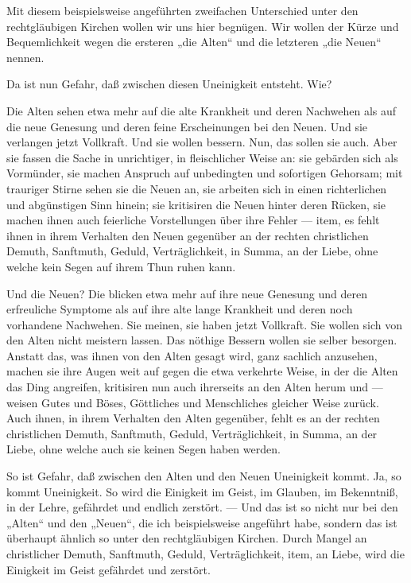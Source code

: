 Mit diesem beispielsweise angeführten zweifachen Unterschied unter den rechtgläubigen Kirchen wollen wir uns hier begnügen. Wir wollen der Kürze und Bequemlichkeit wegen die ersteren „die Alten“ und die letzteren „die Neuen“ nennen.

Da ist nun Gefahr, daß zwischen diesen Uneinigkeit entsteht. Wie?

Die Alten sehen etwa mehr auf die alte Krankheit und deren Nachwehen als auf die neue Genesung und deren feine Erscheinungen bei den Neuen. Und sie verlangen jetzt Vollkraft. Und sie wollen bessern. Nun, das sollen sie auch. Aber sie fassen die Sache in unrichtiger, in fleischlicher Weise an: sie gebärden sich als Vormünder, sie machen Anspruch auf unbedingten und sofortigen Gehorsam; mit trauriger Stirne sehen sie die Neuen an, sie arbeiten sich in einen richterlichen und abgünstigen Sinn hinein; sie kritisiren die Neuen hinter deren Rücken, sie machen ihnen auch feierliche Vorstellungen über ihre Fehler — item, es fehlt ihnen in ihrem Verhalten den Neuen gegenüber an der rechten christlichen Demuth, Sanftmuth, Geduld, Verträglichkeit, in Summa, an der Liebe, ohne welche kein Segen auf ihrem Thun ruhen kann.

Und die Neuen? Die blicken etwa mehr auf ihre neue Genesung und deren erfreuliche Symptome als auf ihre alte lange Krankheit und deren noch vorhandene Nachwehen. Sie meinen, sie haben jetzt Vollkraft. Sie wollen sich von den Alten nicht meistern lassen. Das nöthige Bessern wollen sie selber besorgen. Anstatt das, was ihnen von den Alten gesagt wird, ganz sachlich anzusehen, machen sie ihre Augen weit auf gegen die etwa verkehrte Weise, in der die Alten das Ding angreifen, kritisiren nun auch ihrerseits an den Alten herum und — weisen Gutes und Böses, Göttliches und Menschliches gleicher Weise zurück. Auch ihnen, in ihrem Verhalten den Alten gegenüber, fehlt es an der rechten christlichen Demuth, Sanftmuth, Geduld, Verträglichkeit, in Summa, an der Liebe, ohne welche auch sie keinen Segen haben werden.

So ist Gefahr, daß zwischen den Alten und den Neuen Uneinigkeit kommt. Ja, so kommt Uneinigkeit. So wird die Einigkeit im Geist, im Glauben, im Bekenntniß, in der Lehre, gefährdet und endlich zerstört. — Und das ist so nicht nur bei den „Alten“ und den „Neuen“, die ich beispielsweise angeführt habe, sondern das ist überhaupt ähnlich so unter den rechtgläubigen Kirchen. Durch Mangel an christlicher Demuth, Sanftmuth, Geduld, Verträglichkeit, item, an Liebe, wird die Einigkeit im Geist gefährdet und zerstört.


